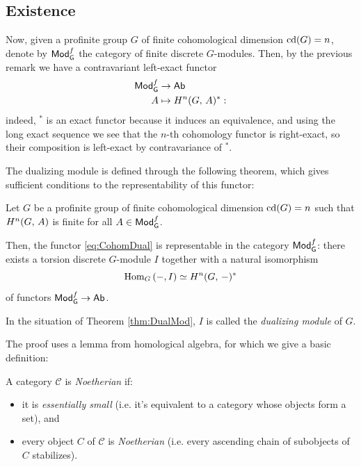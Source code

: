 \documentclass[a4paper, oneside]{memoir}
\begin{document}
\subsection{Existence}

Now, given a profinite group \(G\) of finite cohomological dimension \(\operatorname{cd}(G)=n\), denote by \(\mathsf{Mod}_{\mathsf{G}}^f\) the category of finite discrete \(G\)-modules.
Then, by the previous remark we have a contravariant left-exact functor
\begin{align}\label{eq:CohomDual}
    \mathsf{Mod}_{\mathsf{G}}^f & \to \mathsf{Ab}                \\
    A      & \mapsto H^{n}( G, \, A )^*:
\end{align}
indeed, \(^*\) is an exact functor because it induces an equivalence, and using the long exact sequence we see that the \(n\)-th cohomology functor is right-exact, so their composition is left-exact by contravariance of \(^*\).

The dualizing module is defined through the following theorem, which gives sufficient conditions to the representability of this functor:

\begin{theorem}\label{thm:DualMod}
    Let \(G\) be a profinite group of finite cohomological dimension \(\operatorname{cd}(G)=n\) such that \(H^{n}( G, \, A )\) is finite for all \(A\in\mathsf{Mod}_{\mathsf{G}}^f\).

    Then, the functor \eqref{eq:CohomDual} is representable in the category \(\mathsf{Mod}_{\mathsf{G}}^f\): there exists a torsion discrete \(G\)-module \(I\) together with a natural isomorphism
    \begin{equation}\label{eq:FuncIso}
        \operatorname{Hom}_G\left( -,I \right) \simeq H^{n}( G, \, - )^*
    \end{equation}
    of functors \(\mathsf{Mod}_{\mathsf{G}}^f\to\mathsf{Ab}\).
\end{theorem}

\begin{definition}
    In the situation of Theorem \ref{thm:DualMod}, \(I\) is called the \textit{dualizing module} of \(G\).
\end{definition}

The proof uses a lemma from homological algebra, for which we give a basic definition:

\begin{definition}
    A category \(\mathcal{C}\) is \textit{Noetherian} if:
    \begin{itemize}
        \item it is \textit{essentially small} (i.e. it's equivalent to a category whose objects form a set), and
        \item every object \(C\) of \(\mathcal{C}\) is \textit{Noetherian} (i.e. every ascending chain of subobjects of \(C\) stabilizes).
    \end{itemize}
\end{definition}
\end{document}
